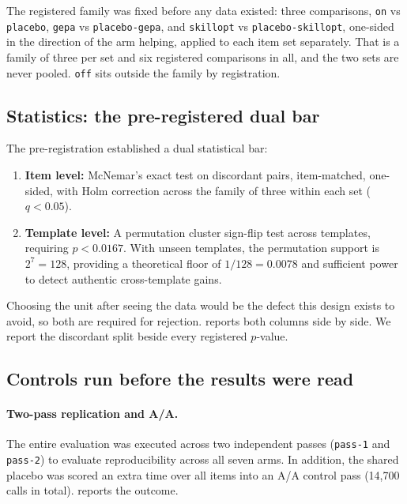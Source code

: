 The registered family was fixed before any data existed: three comparisons,
\texttt{on} vs \texttt{placebo}, \texttt{gepa} vs \texttt{placebo-gepa}, and
\texttt{skillopt} vs \texttt{placebo-skillopt}, one-sided in the direction of
the arm helping, applied to each item set separately. That is a family of three
per set and six registered comparisons in all, and the two sets are never
pooled. \texttt{off} sits outside the family by registration.

\subsection{Statistics: the pre-registered dual bar}

The pre-registration established a dual statistical bar:
\begin{enumerate}
  \item \textbf{Item level:} McNemar's exact test on discordant pairs,
    item-matched, one-sided, with Holm correction across the family of three
    within each set ($q < 0.05$).
  \item \textbf{Template level:} A permutation cluster sign-flip test across
    templates, requiring $p < 0.0167$. With \NUM{\templatesUnseen} unseen
    templates, the permutation support is $2^7 = 128$, providing a theoretical
    floor of $1/128 = 0.0078$ and sufficient power to detect authentic
    cross-template gains.
\end{enumerate}

Choosing the unit after seeing the data would be the defect this design exists
to avoid, so both are required for rejection.  reports both
columns side by side. We report the discordant split beside every registered
$p$-value.

\subsection{Controls run before the results were read}

\paragraph{Two-pass replication and A/A.} The entire evaluation was executed
across two independent passes (\texttt{pass-1} and \texttt{pass-2}) to evaluate
reproducibility across all seven arms. In addition, the shared placebo was
scored an extra time over all \NUM{\totalItems} items into an A/A control pass
(14,700 calls in total).  reports the outcome.

